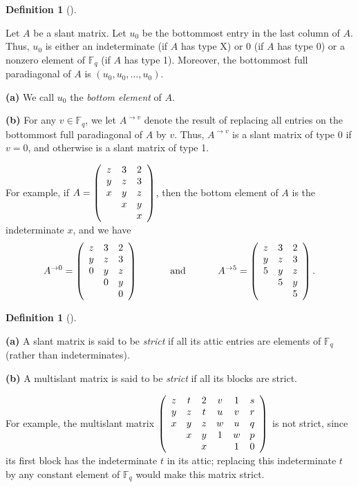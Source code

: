 \documentclass[numbers=enddot,12pt,final,onecolumn,notitlepage]{scrartcl}%
\theoremstyle{definition}
\newtheorem{defi}[theo]{Definition}
\newenvironment{definition}[1][]
{\begin{defi}[#1]\begin{leftbar}}
{\end{leftbar}\end{defi}}
\newcommand{\Fq}{\mathbb{F}_q}
\theoremstyle{plainsl}
\begin{document}
\begin{definition}
Let $A$ be a slant matrix. Let $u_{0}$ be the bottommost entry in the last
column of $A$. Thus, $u_{0}$ is either an indeterminate (if $A$ has type X) or
$0$ (if $A$ has type 0) or a nonzero element of $\Fq$ (if $A$ has
type 1). Moreover, the bottommost full paradiagonal of $A$ is $\left(
u_{0},u_{0},\ldots,u_{0}\right)  $.

\textbf{(a)} We call $u_{0}$ the \emph{bottom element} of $A$.

\textbf{(b)} For any $v\in\Fq$, we let $A^{\rightarrow v}$ denote
the result of replacing all entries on the bottommost full paradiagonal of $A$
by $v$. Thus, $A^{\rightarrow v}$ is a slant matrix of type 0 if $v=0$, and
otherwise is a slant matrix of type 1.
\end{definition}

For example, if $A=\left(
\begin{array}
[c]{ccc}%
z & 3 & 2\\
y & z & 3\\
x & y & z\\
& x & y\\
&  & x
\end{array}
\right)  $, then the bottom element of $A$ is the indeterminate $x$, and we
have%
\[
A^{\rightarrow0}=\left(
\begin{array}
[c]{ccc}%
z & 3 & 2\\
y & z & 3\\
0 & y & z\\
& 0 & y\\
&  & 0
\end{array}
\right)  \ \ \ \ \ \ \ \ \ \ \text{and}\ \ \ \ \ \ \ \ \ \ A^{\rightarrow
5}=\left(
\begin{array}
[c]{ccc}%
z & 3 & 2\\
y & z & 3\\
5 & y & z\\
& 5 & y\\
&  & 5
\end{array}
\right)  .
\]


\begin{definition}
\textbf{(a)} A slant matrix is said to be \emph{strict} if all its attic
entries are elements of $\Fq$ (rather than indeterminates).

\textbf{(b)} A multislant matrix is said to be \emph{strict} if all its blocks
are strict.
\end{definition}

For example, the multislant matrix $\left(
\begin{array}
[c]{cccccc}%
z & t & 2 & v & 1 & s\\
y & z & t & u & v & r\\
x & y & z & w & u & q\\
& x & y & 1 & w & p\\
&  & x &  & 1 & 0
\end{array}
\right)  $ is not strict, since its first block has the indeterminate $t$ in
its attic; replacing this indeterminate $t$ by any constant element of
$\Fq$ would make this matrix strict.
\end{document}
